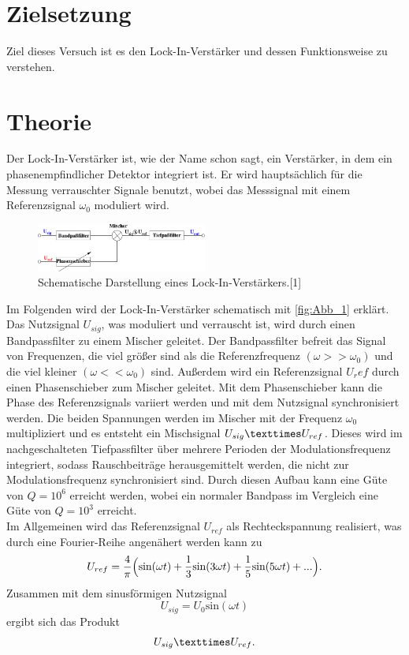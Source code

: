 \section{Zielsetzung}
\label{sec:Zielsetzung}
Ziel dieses Versuch ist es den Lock-In-Verstärker und dessen Funktionsweise zu verstehen.

\section{Theorie}
\label{sec:Theorie}
 Der Lock-In-Verstärker ist, wie der Name schon sagt, ein Verstärker, in dem ein phasenempfindlicher Detektor integriert ist.
 Er wird hauptsächlich für die Messung verrauschter Signale benutzt, wobei das Messsignal mit einem Referenzsignal $\omega_0$ moduliert wird.
 \begin{figure}[H]
    \centering
    \includegraphics[width=0.5\textwidth]{build/Abb_1.pdf}
    \caption {Schematische Darstellung eines Lock-In-Verstärkers.[1]\cite{V303}}
    \label{fig:Abb_1}
\end{figure}
Im Folgenden wird der Lock-In-Verstärker schematisch mit \autoref{fig:Abb_1} erklärt.
Das Nutzsignal $U_{sig}$, was moduliert und verrauscht ist, wird durch einen Bandpassfilter zu einem Mischer geleitet.
Der Bandpassfilter befreit das Signal von Frequenzen, die viel größer sind als die Referenzfrequenz $(\omega >> \omega_0)$ und die viel kleiner $(\omega << \omega_0)$ sind.
Außerdem wird ein Referenzsignal $U_ref$ durch einen Phasenschieber zum Mischer geleitet.
Mit dem Phasenschieber kann die Phase des Referenzsignals variiert werden und mit dem Nutzsignal synchronisiert werden.
Die beiden Spannungen werden im Mischer mit der Frequenz $\omega_0$ multipliziert und es entsteht ein Mischsignal $U_{sig} \texttimes U_{ref}$.
Dieses wird im nachgeschalteten Tiefpassfilter über mehrere Perioden der Modulationsfrequenz integriert, sodass Rauschbeiträge herausgemittelt werden, die nicht zur Modulationsfrequenz synchronisiert sind.
Durch diesen Aufbau kann eine Güte von $Q = 10^6$ erreicht werden, wobei ein normaler Bandpass im Vergleich eine Güte von $Q=10^3$ erreicht.\\
Im Allgemeinen wird das Referenzsignal $U_{ref}$ als Rechteckspannung realisiert, was durch eine Fourier-Reihe angenähert werden kann zu
\begin{equation}
    U_{ref} =\frac{4}{\pi}\Bigl( \text{sin}(\omega t) + \frac{1}{3}\text{sin}(3\omega t) + \frac{1}{5}\text{sin}(5\omega t) + ... \Bigr).
    \label{eqn:Referenzsignal}
\end{equation}
Zusammen mit dem sinusförmigen Nutzsignal
\begin{equation}
    U_{sig} = U_0 \text{sin}(\omega t)
    \label{eqn:Nutzsignal}
\end{equation}
ergibt sich das Produkt
\begin{equation}
    U_{sig} \texttimes U_{ref}.
\end{equation}
